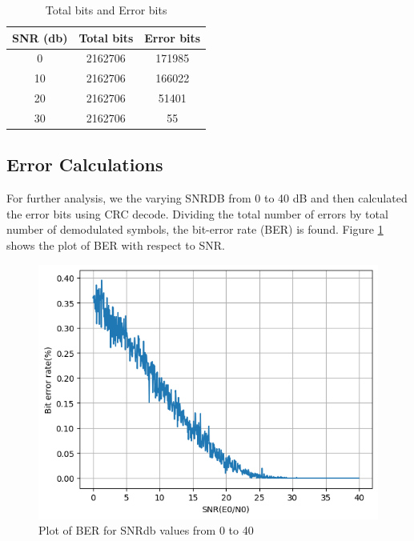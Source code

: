 \begin{table}[htbp]
    \centering
    \begin{tabular}{|c|c|c|}
        \hline
        SNR (db) & Total bits & Error bits \\ \hline
        0        & 2162706    &  171985 \\ \hline
        10       & 2162706    &  166022 \\ \hline
        20       & 2162706    &  51401  \\ \hline
        30       & 2162706    &  55     \\ \hline
    \end{tabular}
    \caption{Total bits and Error bits}
    \label{errors}
\end{table}

\subsection{Error Calculations}
For further analysis, we the varying SNRDB from 0 to 40 dB and then calculated the error bits using CRC decode. Dividing the total number of errors by total number of
demodulated symbols, the bit-error rate (BER) is found. Figure \ref{ber} shows the plot of BER with respect to SNR.

\begin{figure}[htbp]
    \centering
    \includegraphics[width=\linewidth]{../Source/results/ber}
    \caption{Plot of BER for SNRdb values from 0 to 40}
    \label{ber}
\end{figure}


\newpage